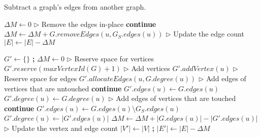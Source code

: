 \begin{algorithm}[hbtp]
\caption{Subtract a graph's edges from another graph.}
\label{alg:sub}
\begin{algorithmic}[1]

\Statex

  \State $\Delta M \gets 0$
  \State $\rhd$ Remove the edges in-place
   \label{alg:sub--inplace-for-begin}
     \textbf{continue} \label{alg:sub--inplace-check}
    \EndIf
    \State $\Delta M \gets \Delta M + G.removeEdges(u, G_S.edges(u))$ \label{alg:sub--inplace-remove}
  \EndFor \label{alg:sub--inplace-for-end}
  \State $\rhd$ Update the edge count
  \State $|E| \gets |E| - \Delta M$ \label{alg:sub--inplace-update-edges}
   \label{alg:sub--inplace-return}
\EndFunction

\Statex

  \State $G' \gets \{\}$ \textbf{;} $\Delta M \gets 0$ \label{alg:sub--init}
  \State $\rhd$ Reserve space for vertices
  \State $G'.reserve(maxVertexId(G) + 1)$ \label{alg:sub--reserve-vertices}
  \State $\rhd$ Add vertices
   \label{alg:sub--add-vertices-begin}
    \State $G'.addVertex(u)$
  \EndFor \label{alg:sub--add-vertices-end}
  \State $\rhd$ Reserve space for edges
   \label{alg:sub--alloc-edges-begin}
    \State $G'.allocateEdges(u, G.degree(u))$
  \EndFor \label{alg:sub--alloc-edges-end}
  \State $\rhd$ Add edges of vertices that are untouched
   \label{alg:sub--copy-untouched-begin}
     \textbf{continue}
    \EndIf
    \State $G'.edges(u) \gets G.edges(u)$
    \State $G'.degree(u) \gets G.degree(u)$
  \EndFor \label{alg:sub--copy-untouched-end}
  \State $\rhd$ Add edges of vertices that are touched
   \label{alg:sub--copy-touched-begin}
     \textbf{continue}
    \EndIf
    \State $G'.edges(u) \gets G.edges(u) \setminus G_S.edges(u)$
    \State $G'.degree(u) \gets |G'.edges(u)|$
    \State $\Delta M \gets \Delta M + |G.edges(u)| - |G'.edges(u)|$
  \EndFor \label{alg:sub--copy-touched-end}
  \State $\rhd$ Update the vertex and edge count
  \State $|V'| \gets |V|$ \textbf{;} $|E'| \gets |E| - \Delta M$ \label{alg:sub--update-counts}
   \label{alg:sub--return}
\EndFunction
\end{algorithmic}
\end{algorithm}
